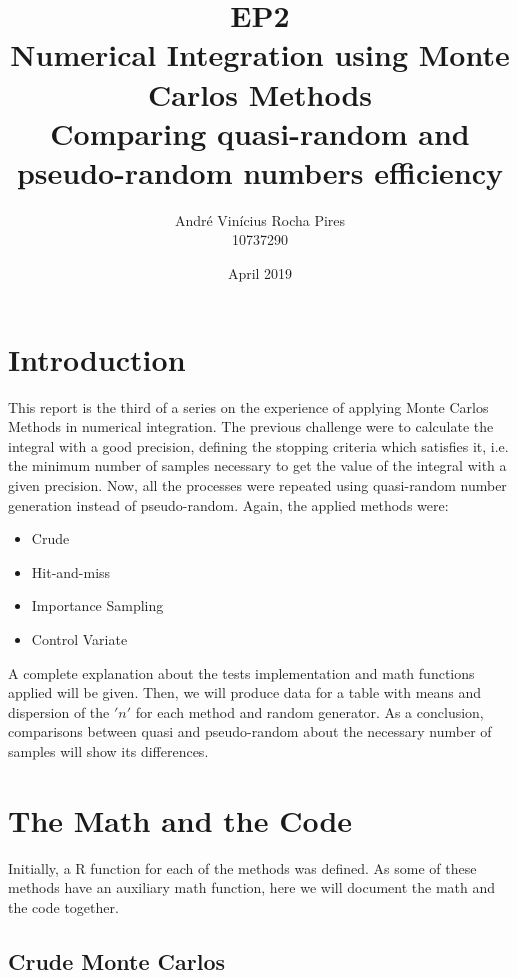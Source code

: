 \documentclass{article}
\title{\Large{EP2} \\ \Large{Numerical Integration using Monte Carlos Methods} \\ \small{Comparing quasi-random and pseudo-random numbers efficiency}}
\author{André Vinícius Rocha Pires \\ 10737290}
\date{April 2019}
\begin{document}
\maketitle

\section{Introduction}
This report is the third of a series on the experience of applying Monte Carlos Methods in numerical integration. The previous challenge were to calculate the integral with a good precision, defining the stopping criteria which satisfies it, i.e. the minimum number of samples necessary to get the value of the integral with a given precision. Now, all the processes were repeated using quasi-random number generation instead of pseudo-random. Again, the applied methods were:

\begin{itemize}
    \item Crude
    \item Hit-and-miss
    \item Importance Sampling
    \item Control Variate
\end{itemize}

A complete explanation about the tests implementation and math functions applied will be given. Then, we will produce data for a table with means and dispersion of the $'n'$ for each method and random generator. As a conclusion, comparisons between quasi and pseudo-random about the necessary number of samples will show its differences.

\section{The Math and the Code}

Initially, a R function for each of the methods was defined. As some of these methods have an auxiliary math function, here we will document the math and the code together. 

\subsection{Crude Monte Carlos}
\end{document}
